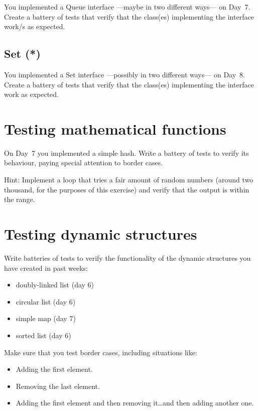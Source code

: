 \documentclass{article}
\begin{document}
You implemented a Queue interface ---maybe in two different ways--- on
Day~7. Create a battery of tests that verify that the class(es)
implementing the interface work/s as expected. 

\subsection{Set (*)}
\label{sec:stack5}

You implemented a Set interface ---possibly in two different ways--- on
Day~8. Create a battery of tests that verify that the class(es)
implementing the interface work as expected. 



\section{Testing mathematical functions}
\label{sec:test-math-funct}

On Day~7 you implemented a simple hash. Write a battery of tests to
verify its behaviour, paying special attention to border cases. 

Hint: Implement a loop that tries a fair amount of random numbers
(around two thousand, for the purposes of this exercise) and verify
that the output is within the range. 


\section{Testing dynamic structures}
\label{sec:testing-maps}

Write batteries of tests to verify the functionality of the dynamic
structures you have created in past weeks: 

\begin{itemize}
\item doubly-linked list (day 6)
\item circular list (day 6)
\item simple map (day 7)
\item sorted list (day 6)
\end{itemize}

Make sure that you test border cases, including situations like: 

\begin{itemize}
\item Adding the first element.
\item Removing the last element.
\item Adding the first element and then removing it\ldots and then
  adding another one.
\end{itemize}
\end{document}

